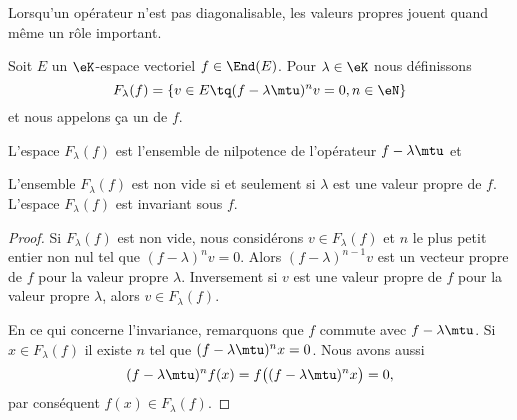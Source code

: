 
Lorsqu'un opérateur n'est pas diagonalisable, les valeurs propres jouent quand même un rôle important.

\begin{definition}  \label{DefFBNIooCGbIix}
    Soit \( E\) un \( \eK\)-espace vectoriel  \( f\in\End(E)\). Pour \( \lambda\in \eK\) nous définissons
    \begin{equation}
        F_{\lambda}(f)=\{ v\in E\tq (f-\lambda\mtu)^nv=0, n\in\eN \}
    \end{equation}
    et nous appelons ça un  de \( f\).
\end{definition}
L'espace \( F_{\lambda}(f)\) est l'ensemble de nilpotence de l'opérateur \( f-\lambda\mtu\) et

\begin{lemma}   \label{LemBLPooHMAoyJ}
    L'ensemble \( F_{\lambda}(f)\) est non vide si et seulement si \( \lambda\) est une valeur propre de \( f\). L'espace \( F_{\lambda}(f)\) est invariant sous \( f\).
\end{lemma}

\begin{proof}
    Si \( F_{\lambda}(f)\) est non vide, nous considérons \( v\in F_{\lambda}(f)\) et \( n\) le plus petit entier non nul tel que \( (f-\lambda)^nv=0\). Alors \( (f-\lambda)^{n-1}v\) est un vecteur propre de \( f\) pour la valeur propre \( \lambda\). Inversement si \( v\) est une valeur propre de \( f\) pour la valeur propre \( \lambda\), alors \( v\in F_{\lambda}(f)\).

    En ce qui concerne l'invariance, remarquons que \( f\) commute avec \( f-\lambda\mtu\). Si \( x\in F_{\lambda}(f)\) il existe \( n\) tel que \( (f-\lambda\mtu)^nx=0\). Nous avons aussi
    \begin{equation}
        (f-\lambda\mtu)^nf(x)=f\big( (f-\lambda\mtu)^nx \big)=0,
    \end{equation}
    par conséquent \( f(x)\in F_{\lambda}(f)\).
\end{proof}

